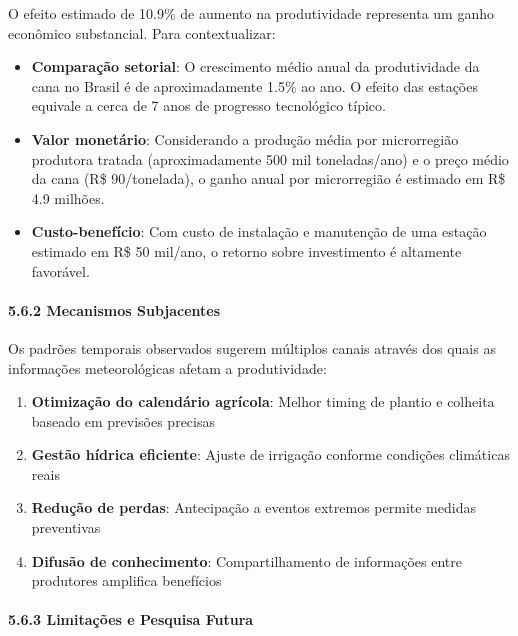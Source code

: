 \documentclass[
  brazilian,
  12pt,
  a4paper,
]{article}
\providecommand{\tightlist}{%
  \setlength{\itemsep}{0pt}\setlength{\parskip}{0pt}}
\begin{document}
O efeito estimado de 10.9\% de aumento na produtividade representa um
ganho econômico substancial. Para contextualizar:

\begin{itemize}
\item
  \textbf{Comparação setorial}: O crescimento médio anual da
  produtividade da cana no Brasil é de aproximadamente 1.5\% ao ano. O
  efeito das estações equivale a cerca de 7 anos de progresso
  tecnológico típico.
\item
  \textbf{Valor monetário}: Considerando a produção média por
  microrregião produtora tratada (aproximadamente 500 mil toneladas/ano)
  e o preço médio da cana (R\$ 90/tonelada), o ganho anual por
  microrregião é estimado em R\$ 4.9 milhões.
\item
  \textbf{Custo-benefício}: Com custo de instalação e manutenção de uma
  estação estimado em R\$ 50 mil/ano, o retorno sobre investimento é
  altamente favorável.
\end{itemize}

\paragraph{\texorpdfstring{\textbf{5.6.2 Mecanismos
Subjacentes}}{5.6.2 Mecanismos Subjacentes}}\label{mecanismos-subjacentes}

Os padrões temporais observados sugerem múltiplos canais através dos
quais as informações meteorológicas afetam a produtividade:

\begin{enumerate}
\def\labelenumi{\arabic{enumi}.}
\tightlist
\item
  \textbf{Otimização do calendário agrícola}: Melhor timing de plantio e
  colheita baseado em previsões precisas
\item
  \textbf{Gestão hídrica eficiente}: Ajuste de irrigação conforme
  condições climáticas reais
\item
  \textbf{Redução de perdas}: Antecipação a eventos extremos permite
  medidas preventivas
\item
  \textbf{Difusão de conhecimento}: Compartilhamento de informações
  entre produtores amplifica benefícios
\end{enumerate}

\paragraph{\texorpdfstring{\textbf{5.6.3 Limitações e Pesquisa
Futura}}{5.6.3 Limitações e Pesquisa Futura}}\label{limitauxe7uxf5es-e-pesquisa-futura}
\end{document}
